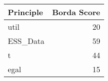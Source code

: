 \begin{tabular}{lr}
\toprule
Principle & Borda Score \\
\midrule
util & 20 \\
ESS_Data & 59 \\
t & 44 \\
egal & 15 \\
\bottomrule
\end{tabular}
